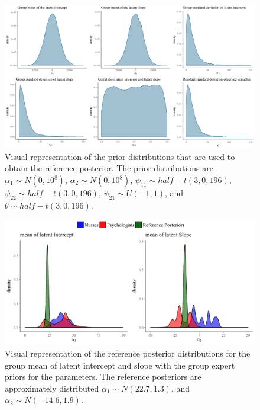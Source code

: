\documentclass[openright,titlepage,12pt,a4paper]{book}
\begin{document}
\begin{figure}[H]

{\centering \includegraphics[width=1\linewidth]{figures/chapter_6/priors_reference} 

}

\caption{Visual representation of the prior distributions that are used to obtain the reference posterior. The prior distributions are \(\alpha_1 \sim N(0, 10^8)\), \(\alpha_2 \sim N(0, 10^8)\), \(\psi_{11} \sim half-t(3, 0, 196)\), \(\psi_{22} \sim half-t(3, 0, 196)\), \(\psi_{21} \sim U(-1, 1)\), and \(\theta \sim half-t(3, 0, 196)\).}\label{fig:ch06fig8}
\end{figure}



\begin{figure}[H]

{\centering \includegraphics[width=1\linewidth]{figures/chapter_6/experts_vs_reference} 

}

\caption{Visual representation of the reference posterior distributions for the group mean of latent intercept and slope with the group expert priors for the parameters. The reference posteriors are approximately distributed \(\alpha_1 \sim N(22.7, 1.3)\), and \(\alpha_2 \sim N(-14.6, 1.9)\).}\label{fig:ch06fig9}
\end{figure}
\end{document}

